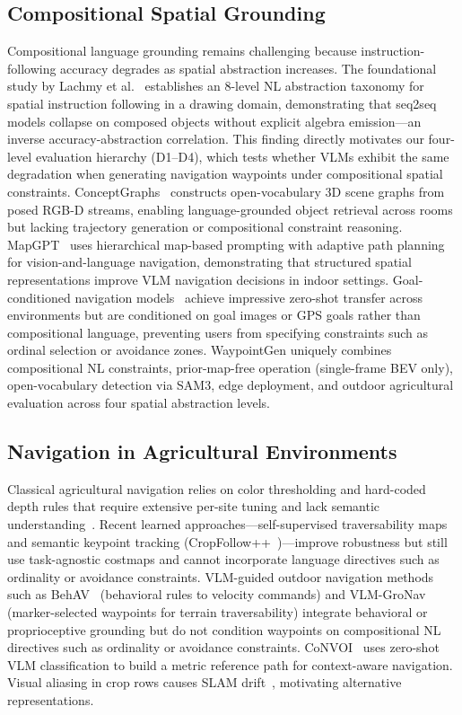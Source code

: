 \documentclass{article}
\begin{document}
\subsection{Compositional Spatial Grounding}
Compositional language grounding remains challenging because instruction-following accuracy degrades as spatial abstraction increases. The foundational study by Lachmy et al.~\citep{lachmy2022draw} establishes an 8-level NL abstraction taxonomy for spatial instruction following in a drawing domain, demonstrating that seq2seq models collapse on composed objects without explicit algebra emission---an inverse accuracy-abstraction correlation. This finding directly motivates our four-level evaluation hierarchy (D1--D4), which tests whether VLMs exhibit the same degradation when generating navigation waypoints under compositional spatial constraints. ConceptGraphs~\citep{gu2024conceptgraphs} constructs open-vocabulary 3D scene graphs from posed RGB-D streams, enabling language-grounded object retrieval across rooms but lacking trajectory generation or compositional constraint reasoning. MapGPT~\citep{chen2024mapgpt} uses hierarchical map-based prompting with adaptive path planning for vision-and-language navigation, demonstrating that structured spatial representations improve VLM navigation decisions in indoor settings. Goal-conditioned navigation models~\citep{shah2023gnm,shah2023vint,sridhar2024nomad,wang2025genie} achieve impressive zero-shot transfer across environments but are conditioned on goal images or GPS goals rather than compositional language, preventing users from specifying constraints such as ordinal selection or avoidance zones. WaypointGen uniquely combines compositional NL constraints, prior-map-free operation (single-frame BEV only), open-vocabulary detection via SAM3, edge deployment, and outdoor agricultural evaluation across four spatial abstraction levels.

\subsection{Navigation in Agricultural Environments}
Classical agricultural navigation relies on color thresholding and hard-coded depth rules that require extensive per-site tuning and lack semantic understanding~\citep{bac2014harvesting}. Recent learned approaches---self-supervised traversability maps~\citep{gasparino2024wayfaster} and semantic keypoint tracking (CropFollow++~\citep{sivakumar2024cropfollowpp})---improve robustness but still use task-agnostic costmaps and cannot incorporate language directives such as ordinality or avoidance constraints. VLM-guided outdoor navigation methods such as BehAV~\citep{weerakoon2025behav} (behavioral rules to velocity commands) and VLM-GroNav~\citep{elnoor2025vlmgronav} (marker-selected waypoints for terrain traversability) integrate behavioral or proprioceptive grounding but do not condition waypoints on compositional NL directives such as ordinality or avoidance constraints. CoNVOI~\citep{sathyamoorthy2024convoi} uses zero-shot VLM classification to build a metric reference path for context-aware navigation. Visual aliasing in crop rows causes SLAM drift~\citep{cuaran2024undercanopy}, motivating alternative representations.
\end{document}
